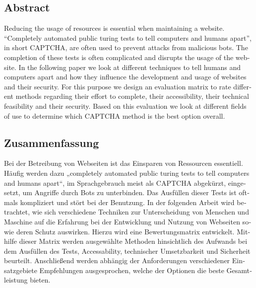 \begingroup
\let\clearpage\relax
\let\cleardoublepage\relax
\let\cleardoublepage\relax

\begin{otherlanguage}{american}
	\chapter*{Abstract}
	Reducing the usage of resources is essential when maintaining a website. “Completely automated public turing tests to tell computers and humans apart”, in short CAPTCHA, are often used to prevent attacks from malicious bots. The completion of these tests is often complicated and disrupts the usage of the website. 
In the following paper we look at different techniques to tell humans and computers apart and how they influence the development and usage of websites and their security. For this purpose we design an evaluation matrix to rate different methods regarding their effort to complete, their accessibility, their technical feasibility and their security. Based on this evaluation we look at different fields of use to determine which CAPTCHA method is the best option overall.
\end{otherlanguage}

\newpage
\cleardoublepage

\begin{otherlanguage}{ngerman}
	\chapter*{Zusammenfassung}
	Bei der Betreibung von Webseiten ist das Einsparen von Ressourcen essentiell. Häufig werden dazu „completely automated public turing tests to tell computers and humans apart“, im Sprachgebrauch meist als CAPTCHA abgekürzt, eingesetzt, um Angriffe durch Bots zu unterbinden. Das Ausfüllen dieser Tests ist oftmals kompliziert und stört bei der Benutzung. 
In der folgenden Arbeit wird betrachtet, wie sich verschiedene Techniken zur Unterscheidung von Menschen und Maschine auf die Erfahrung bei der Entwicklung und Nutzung von Webseiten sowie deren Schutz auswirken. Hierzu wird eine Bewertungsmatrix entwickelt. Mithilfe dieser Matrix werden ausgewählte Methoden hinsichtlich des Aufwands bei dem Ausfüllen des Tests, Accessability, technischer Umsetzbarkeit und Sicherheit beurteilt.  
Anschließend werden abhängig der Anforderungen verschiedener Einsatzgebiete Empfehlungen ausgesprochen, welche der Optionen die beste Gesamtleistung bieten.
\end{otherlanguage}

\endgroup

\vfill
